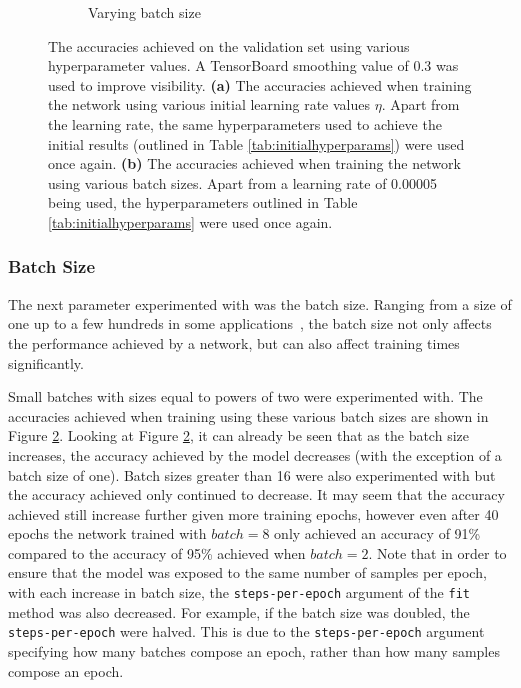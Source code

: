 \begin{figure}[!t]
\begin{subfigure}[b]{0.49\textwidth}
        \caption{Varying batch size}
        \label{fig:bsplot}
    \end{subfigure}
    \caption{The accuracies achieved on the validation set using various hyperparameter values. A TensorBoard smoothing value of 0.3 was used to improve visibility. \textbf{(a)} The accuracies achieved when training the network using various initial learning rate values $\eta$. Apart from the learning rate, the same hyperparameters used to achieve the initial results (outlined in Table \ref{tab:initialhyperparams}) were used once again. \textbf{(b)} The accuracies achieved when training the network using various batch sizes. Apart from a learning rate of 0.00005 being used, the hyperparameters outlined in Table \ref{tab:initialhyperparams} were used once again.}
\end{figure}

\subsubsection{Batch Size}

The next parameter experimented with was the batch size. Ranging from a size of one up to a few hundreds in some applications~\cite{bengio2012practical}, the batch size not only affects the performance achieved by a network, but can also affect training times significantly.

Small batches with sizes equal to powers of two were experimented with. The accuracies achieved when training using these various batch sizes are shown in Figure \ref{fig:bsplot}. Looking at Figure \ref{fig:bsplot}, it can already be seen that as the batch size increases, the accuracy achieved by the model decreases (with the exception of a batch size of one). Batch sizes greater than 16 were also experimented with but the accuracy achieved only continued to decrease. It may seem that the accuracy achieved still increase further given more training epochs, however even after 40 epochs the network trained with $batch=8$ only achieved an accuracy of 91\% compared to the accuracy of 95\% achieved when $batch=2$. Note that in order to ensure that the model was exposed to the same number of samples per epoch, with each increase in batch size, the \texttt{steps-per-epoch} argument of the \texttt{fit} method was also decreased. For example, if the batch size was doubled, the \texttt{steps-per-epoch} were halved. This is due to the \texttt{steps-per-epoch} argument specifying how many batches compose an epoch, rather than how many samples compose an epoch.

